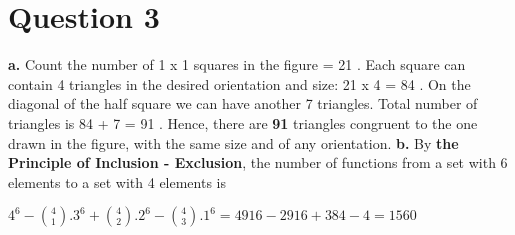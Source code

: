\documentclass[11pt]{article}
\begin{document}
\section*{Question 3}
\textbf{a.} \newline \newline
Count the number of 1 x 1 squares in the figure = 21 .\newline \newline
Each square can contain 4 triangles in the desired orientation and size: 21 x 4 = 84 .\newline \newline
On the diagonal of the half square we can have another 7 triangles.\newline \newline
Total number of triangles is 84 + 7 = 91 . \newline \newline
Hence, there are \textbf{91} triangles congruent to the one drawn in the figure, with
the same size and of any orientation. \newline \newline 
\textbf{b.} \newline \newline
\indent By \textbf{the Principle of Inclusion - Exclusion}, the number of functions from a set with 6 elements to a set with 4 elements is 
\begin{center}
    $4^6 - {4 \choose 1}.3^6 + {4 \choose 2}.2^6 - {4 \choose 3}.1^6 = 4916 - 2916 + 384 - 4 = 1560$\newline
\end{center}
\begin{center}
\end{center}



\newpage
\end{document}
